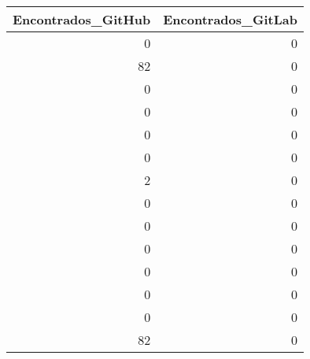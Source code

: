 \begin{tabular}{rr}
\toprule
 Encontrados\_GitHub &  Encontrados\_GitLab \\
\midrule
                  0 &                   0 \\
                 82 &                   0 \\
                  0 &                   0 \\
                  0 &                   0 \\
                  0 &                   0 \\
                  0 &                   0 \\
                  2 &                   0 \\
                  0 &                   0 \\
                  0 &                   0 \\
                  0 &                   0 \\
                  0 &                   0 \\
                  0 &                   0 \\
                  0 &                   0 \\
                 82 &                   0 \\
\bottomrule
\end{tabular}
